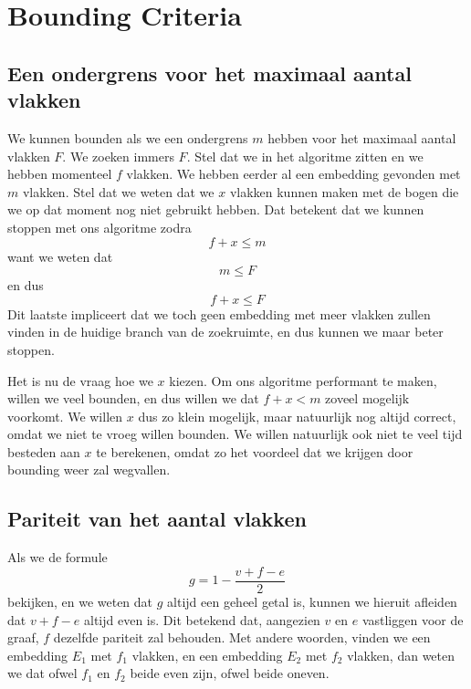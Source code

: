 \documentclass{article}
\begin{document}
\section{Bounding Criteria}

\subsection{Een ondergrens voor het maximaal aantal vlakken}
\label{ondergrens-maximaal-aantal-vlakken}
We kunnen bounden als we een ondergrens $m$ hebben voor het maximaal aantal
vlakken $F$. We zoeken immers $F$. Stel dat we in het algoritme zitten en we
hebben momenteel $f$ vlakken. We hebben eerder al een embedding gevonden met
$m$ vlakken. Stel dat we weten dat we $x$ vlakken kunnen maken met de bogen die
we op dat moment nog niet gebruikt hebben. Dat betekent dat we kunnen stoppen
met ons algoritme zodra
\begin{equation*}
f + x \leq m
\end{equation*}
want we weten dat
\begin{equation*}
m \leq F
\end{equation*}
en dus
\begin{equation*}
f + x \leq F
\end{equation*}
Dit laatste impliceert dat we toch geen embedding met meer vlakken zullen vinden
in de huidige branch van de zoekruimte, en dus kunnen we maar beter stoppen.
\newline

Het is nu de vraag hoe we $x$ kiezen. Om ons algoritme performant te maken,
willen we veel bounden, en dus willen we dat $f + x < m$ zoveel mogelijk
voorkomt. We willen $x$ dus zo klein mogelijk, maar natuurlijk nog altijd
correct, omdat we niet te vroeg willen bounden. We willen natuurlijk ook niet
te veel tijd besteden aan $x$ te berekenen, omdat zo het voordeel dat we krijgen
door bounding weer zal wegvallen.

\subsection{Pariteit van het aantal vlakken}
Als we de formule
\begin{equation*}
g = 1 - \frac{v + f - e}{2}
\end{equation*}
bekijken, en we weten dat $g$ altijd een geheel getal is, kunnen we hieruit
afleiden dat $v + f - e$ altijd even is. Dit betekend dat, aangezien $v$ en $e$
vastliggen voor de graaf, $f$ dezelfde pariteit zal behouden. Met andere
woorden, vinden we een embedding $E_1$ met $f_1$ vlakken, en een embedding $E_2$
met $f_2$ vlakken, dan weten we dat ofwel $f_1$ en $f_2$ beide even zijn, ofwel
beide oneven.
\end{document}

